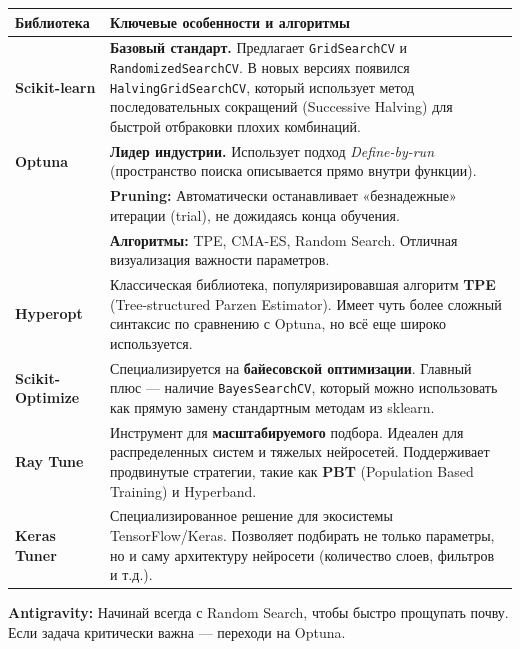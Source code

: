 \documentclass[12pt]{article}
\newcommand{\antigravity}[1]{{\small\color{antigravityblue}\textbf{Antigravity:} #1}}
\begin{document}
\begin{longtable}{lp{}}
\toprule
\textbf{Библиотека} & \textbf{Ключевые особенности и алгоритмы} \\
\midrule
\textbf{Scikit-learn} & \textbf{Базовый стандарт.} Предлагает \texttt{GridSearchCV} и \texttt{RandomizedSearchCV}. В новых версиях появился \texttt{HalvingGridSearchCV}, который использует метод последовательных сокращений (Successive Halving) для быстрой отбраковки плохих комбинаций. \\
\midrule
\textbf{Optuna} & \textbf{Лидер индустрии.} Использует подход \textit{Define-by-run} (пространство поиска описывается прямо внутри функции). \\
& \textbullet{} \textbf{Pruning:} Автоматически останавливает «безнадежные» итерации (trial), не дожидаясь конца обучения. \\
& \textbullet{} \textbf{Алгоритмы:} TPE, CMA-ES, Random Search. Отличная визуализация важности параметров. \\
\midrule
\textbf{Hyperopt} & Классическая библиотека, популяризировавшая алгоритм \textbf{TPE} (Tree-structured Parzen Estimator). Имеет чуть более сложный синтаксис по сравнению с Optuna, но всё еще широко используется. \\
\midrule
\textbf{Scikit-Optimize} & Специализируется на \textbf{байесовской оптимизации}. Главный плюс — наличие \texttt{BayesSearchCV}, который можно использовать как прямую замену стандартным методам из sklearn. \\
\midrule
\textbf{Ray Tune} & Инструмент для \textbf{масштабируемого} подбора. Идеален для распределенных систем и тяжелых нейросетей. Поддерживает продвинутые стратегии, такие как \textbf{PBT} (Population Based Training) и Hyperband. \\
\midrule
\textbf{Keras Tuner} & Специализированное решение для экосистемы TensorFlow/Keras. Позволяет подбирать не только параметры, но и саму архитектуру нейросети (количество слоев, фильтров и т.д.). \\
\bottomrule
\end{longtable}

\antigravity{Начинай всегда с Random Search, чтобы быстро прощупать почву. Если задача критически важна — переходи на Optuna.}
\end{document}
